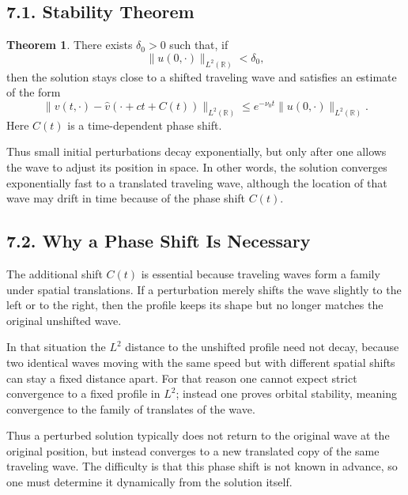 \documentclass[11pt]{article}
\theoremstyle{definition}
\newtheorem{theorem}{Theorem}
\theoremstyle{remark}
\begin{document}
\subsection*{7.1. Stability Theorem}
\begin{theorem}
There exists $\delta_0>0$ such that, if
\[
\|u(0,\cdot)\|_{L^2(\mathbb R)}<\delta_0,
\]
then the solution stays close to a shifted traveling wave and satisfies an estimate of the form
\[
\|v(t,\cdot)-\hat v(\cdot+ct+C(t))\|_{L^2(\mathbb R)}
\leq
e^{-\nu_0 t}\|u(0,\cdot)\|_{L^2(\mathbb R)}.
\]
Here $C(t)$ is a time-dependent phase shift.
\end{theorem}

Thus small initial perturbations decay exponentially, but only after one allows the wave to adjust its position in space.
In other words, the solution converges exponentially fast to a translated traveling wave, although the location of that wave may drift in time because of the phase shift $C(t)$.

\subsection*{7.2. Why a Phase Shift Is Necessary}
The additional shift $C(t)$ is essential because traveling waves form a family under spatial translations. If a perturbation merely shifts the wave slightly to the left or to the right, then the profile keeps its shape but no longer matches the original unshifted wave.

In that situation the $L^2$ distance to the unshifted profile need not decay, because two identical waves moving with the same speed but with different spatial shifts can stay a fixed distance apart. For that reason one cannot expect strict convergence to a fixed profile in $L^2$; instead one proves orbital stability, meaning convergence to the family of translates of the wave.

Thus a perturbed solution typically does not return to the original wave at the original position, but instead converges to a new translated copy of the same traveling wave.
The difficulty is that this phase shift is not known in advance, so one must determine it dynamically from the solution itself.
\end{document}
